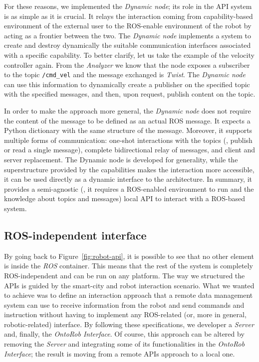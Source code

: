 For these reasons, we implemented the \textit{Dynamic node}; its role in the API system is as simple as it is crucial. It relays the interaction coming from capability-based environment of the external user to the ROS-enable environment of the robot by acting as a frontier between the two. The \textit{Dynamic node} implements a system to create and destroy dynamically the suitable communication interfaces associated with a specific capability. To better clarify, let us take the example of the velocity controller again. From the \textit{Analyzer} we know that the node exposes a subscriber to the topic \texttt{/cmd\_vel} and the message exchanged is \textit{Twist}. The \textit{Dynamic node} can use this information to dynamically create a publisher on the specified topic with the specified messages, and then, upon request, publish content on the topic.

In order to make the approach more general, the \textit{Dynamic node} does not require the content of the message to be defined as an actual ROS message. It expects a Python dictionary with the same structure of the message. Moreover, it supports multiple forms of communication: one-shot interactions with the topics (\ie, publish or read a single message), complete bidirectional relay of messages, and client and server replacement. The {Dynamic node} is developed for generality, while the superstructure provided by the capabilities makes the interaction more accessible, it can be used directly as a dynamic interface to the architecture. In summary, it provides a semi-agnostic (\ie, it requires a ROS-enabled environment to run and the knowledge about topics and messages) local API to interact with a ROS-based system.

\subsection{ROS-independent interface}
By going back to Figure~\ref{fig:robot-api}, it is possible to see that no other element is inside the \textit{ROS} container. This means that the rest of the system is completely ROS-independent and can be run on any platform. The way we structured the APIs is guided by the smart-city and robot interaction scenario. What we wanted to achieve was to define an interaction approach that a remote data management system can use to receive information from the robot and send commands and instruction without having to implement any ROS-related (or, more in general, robotic-related) interface. By following these specifications, we developer a \textit{Server} and, finally, the \textit{OntoRob Interface}. Of course, this approach can be altered by removing the \textit{Server} and integrating some of its functionalities in the \textit{OntoRob Interface}; the result is moving from a remote APIs approach to a local one.

